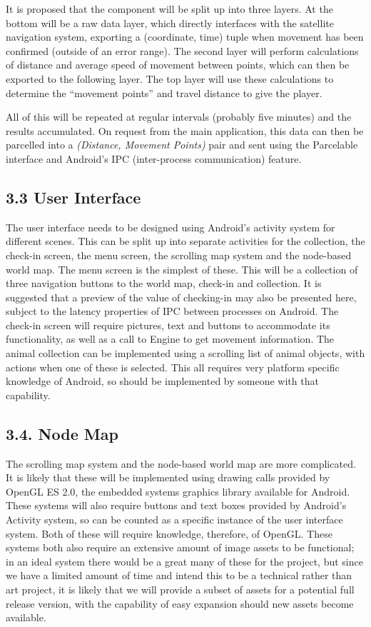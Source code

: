 \documentclass[]{report}
\begin{document}
It is proposed that the component will be split up into three layers. At the bottom will be a raw data layer, which directly interfaces with the satellite navigation system, exporting a (coordinate, time) tuple when movement has been confirmed (outside of an error range). The second layer will perform calculations of distance and average speed of movement between points, which can then be exported to the following layer. The top layer will use these calculations to determine the ``movement points'' and travel distance to give the player. 

All of this will be repeated at regular intervals (probably five minutes) and the results accumulated. On request from the main application, this data can then be parcelled into a \textit{(Distance, Movement Points)} pair and sent using the Parcelable interface and Android's IPC (inter-process communication) feature.

\subsection*{3.3 User Interface}

The user interface needs to be designed using Android's activity system for different scenes. This can be split up into separate activities for the collection, the check-in screen, the menu screen, the scrolling map system and the node-based world map. The menu screen is the simplest of these. This will be a collection of three navigation buttons to the world map, check-in and collection. It is suggested that a preview of the value of checking-in may also be presented here, subject to the latency properties of IPC between processes on Android. The check-in screen will require pictures, text and buttons to accommodate its functionality, as well as a call to Engine to get movement information. The animal collection can be implemented using a scrolling list of animal objects, with actions when one of these is selected. This all requires very platform specific knowledge of Android, so should be implemented by someone with that capability.

\subsection*{3.4. Node Map}

The scrolling map system and the node-based world map are more complicated. It is likely that these will be implemented using drawing calls provided by OpenGL ES 2.0, the embedded systems graphics library available for Android. These systems will also require buttons and text boxes provided by Android's Activity system, so can be counted as a specific instance of the user interface system. Both of these will require knowledge, therefore, of OpenGL. These systems both also require an extensive amount of image assets to be functional; in an ideal system there would be a great many of these for the project, but since we have a limited amount of time and intend this to be a technical rather than art project, it is likely that we will provide a subset of assets for a potential full release version, with the capability of easy expansion should new assets become available.
\end{document}
